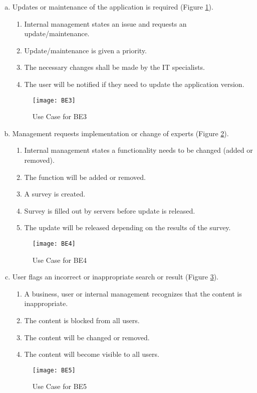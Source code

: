 \documentclass[titlepage]{article}
\begin{document}
\begin{enumerate}[a)]
	\item Updates or maintenance of the application is required (Figure \ref{usecase:updates}).
		\begin{enumerate}[{BE3}.1]
			\item Internal management states an issue and requests an update/maintenance.
			\item Update/maintenance is given a priority.
			\item The necessary changes shall be made by the IT specialists.
			\item The user will be notified if they need to update the application version.
		\end{enumerate}
	\begin{center}
		\begin{figure}[H]
			\texttt{[image: BE3]}
			\caption{Use Case for BE3}\label{usecase:updates}
		\end{figure}
	\end{center}
	
	\item Management requests implementation or change of experts (Figure \ref{usecase:change_expert}).
		\begin{enumerate}[{BE4}.1]
			\item Internal management states a functionality needs to be changed (added or removed).
			\item The function will be added or removed.
			\item A survey is created.
			\item Survey is filled out by servers before update is released.
			\item The update will be released depending on the results of the survey.
		\end{enumerate}
	\begin{center}
		\begin{figure}[h!]
			\texttt{[image: BE4]}
			\caption{Use Case for BE4}\label{usecase:change_expert}
		\end{figure}
	\end{center}

\newpage
	\item User flags an incorrect or inappropriate search or result (Figure \ref{usecase:badsearch}).
		\begin{enumerate}[{BE5}.1]
			\item A business, user or internal management recognizes that the content is inappropriate.
			\item The content is blocked from all users.
			\item The content will be changed or removed.
			\item The content will become visible to all users.
		\end{enumerate}
	\begin{center}
		\begin{figure}[H]
			\texttt{[image: BE5]}
			\caption{Use Case for BE5}\label{usecase:badsearch}
		\end{figure}
	\end{center}
	

\end{enumerate}
\end{document}
